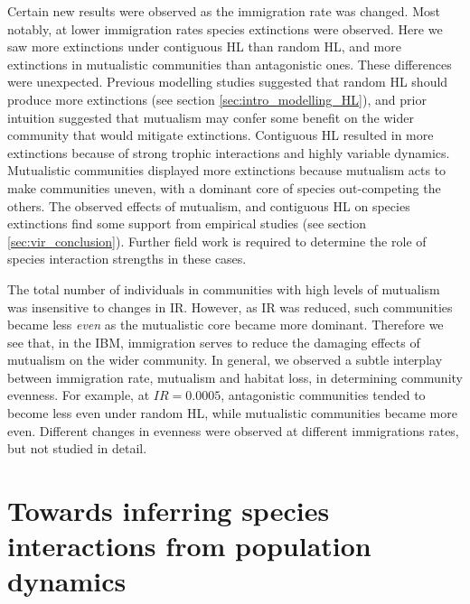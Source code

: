 Certain new results were observed as the immigration rate was changed. Most notably, at lower immigration rates species extinctions were observed. Here we saw more extinctions under contiguous HL than random HL, and more extinctions in mutualistic communities than antagonistic ones. These differences were unexpected. Previous modelling studies suggested that random HL should produce more extinctions (see section \ref{sec:intro_modelling_HL}), and prior intuition suggested that mutualism may confer some benefit on the wider community that would mitigate extinctions. Contiguous HL resulted in more extinctions because of strong trophic interactions and highly variable dynamics. Mutualistic communities displayed more extinctions because mutualism acts to make communities uneven, with a dominant core of species out-competing the others. The observed effects of mutualism, and contiguous HL on species extinctions find some support from empirical studies (see section \ref{sec:vir_conclusion}). Further field work is required to determine the role of species interaction strengths in these cases.

The total number of individuals in communities with high levels of mutualism was insensitive to changes in IR. However, as IR was reduced, such communities became less \emph{even} as the mutualistic core became more dominant. Therefore we see that, in the IBM, immigration serves to reduce the damaging effects of mutualism on the wider community. In general, we observed a subtle interplay between immigration rate, mutualism and habitat loss, in determining community evenness. For example, at $IR=0.0005$, antagonistic communities tended to become less even under random HL, while mutualistic communities became more even. Different changes in evenness were observed at different immigrations rates, but not studied in detail.

\section{Towards inferring species interactions from population dynamics}
\label{sec:tisifpd}

